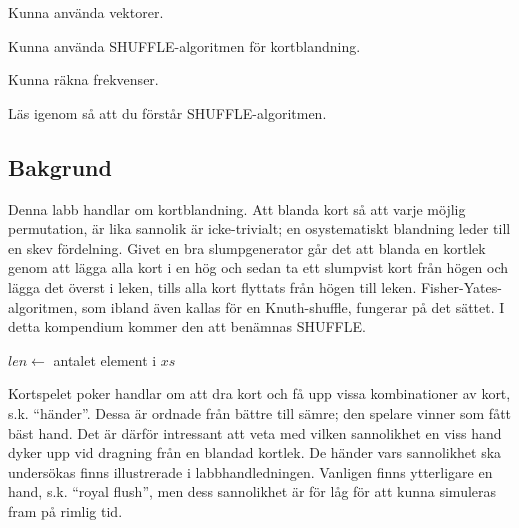 

\Lab{\LabWeekFIVE}

\begin{Goals}
\item Kunna använda vektorer.
\item Kunna använda SHUFFLE-algoritmen för kortblandning.
\item Kunna räkna frekvenser.
\end{Goals}

\begin{Preparations}
\item Läs igenom så att du förstår SHUFFLE-algoritmen.
\end{Preparations}

\subsection{Bakgrund}

Denna labb handlar om kortblandning. Att blanda kort så att varje möjlig permutation,  är lika sannolik är icke-trivialt; en osystematiskt blandning leder till en skev fördelning. Givet en bra slumpgenerator går det att blanda en kortlek genom att lägga alla kort i en hög och sedan ta ett slumpvist kort från högen och lägga det överst i leken, tills alla kort flyttats från högen till leken. Fisher-Yates-algoritmen, som ibland även kallas för en Knuth-shuffle, fungerar på det sättet. I detta kompendium kommer den att benämnas SHUFFLE.

\begin{algorithm}[H]
 $len \leftarrow$ antalet element i $xs$ \\
\end{algorithm}

Kortspelet poker handlar om att dra kort och få upp vissa kombinationer av kort, s.k. ``händer''. Dessa är ordnade från bättre till sämre; den spelare vinner som fått bäst hand.
Det är därför intressant att veta med vilken sannolikhet en viss hand dyker upp vid dragning från en blandad kortlek.
De händer vars sannolikhet ska undersökas finns illustrerade i labbhandledningen.
Vanligen finns ytterligare en hand, s.k. ``royal flush'', men dess sannolikhet är för låg för att kunna simuleras fram på rimlig tid.

